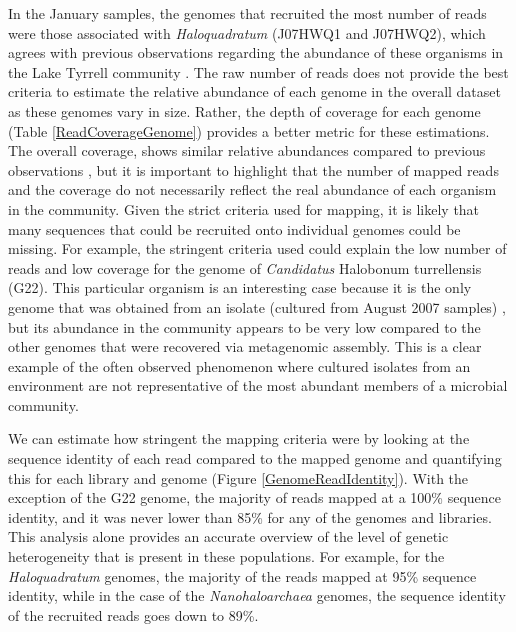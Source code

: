 In the January samples, the genomes that recruited the most number of reads were those associated with \textit{Haloquadratum} (J07HWQ1 and J07HWQ2), which agrees with previous observations regarding the abundance of these organisms in the Lake Tyrrell community \cite{Podell:2013kx}. The raw number of reads does not provide the best criteria to estimate the relative abundance of each genome in the overall dataset as these genomes vary in size. Rather, the depth of coverage for each genome (Table \ref{ReadCoverageGenome}) provides a better metric for these estimations. The overall coverage, shows similar relative abundances compared to previous observations \cite{Podell:2013kx}, but it is important to highlight that the number of mapped reads and the coverage do not necessarily reflect the real abundance of each organism in the community. Given the strict criteria used for mapping, it is likely that many sequences that could be recruited onto individual genomes could be missing. For example, the stringent criteria used could explain the low number of reads and low coverage for the genome of \textit{Candidatus} Halobonum turrellensis (G22). This particular organism is an interesting case because it is the only genome that was obtained from an isolate (cultured from August 2007 samples) \cite{Ugalde:2013hb}, but its abundance in the community appears to be very low compared to the other genomes that were recovered via metagenomic assembly. This is a clear example of the often observed phenomenon where cultured isolates from an environment are not representative of the most abundant members of a microbial community.

We can estimate how stringent the mapping criteria were by looking at the sequence identity of each read compared to the mapped genome and quantifying this for each library and genome (Figure \ref{GenomeReadIdentity}). With the exception of the G22 genome, the majority of reads mapped at a 100\% sequence identity, and it was never lower than 85\% for any of the genomes and libraries. This analysis alone provides an accurate overview of the level of genetic heterogeneity that is present in these populations. For example, for the \textit{Haloquadratum} genomes, the majority of the reads mapped at 95\% sequence identity, while in the case of the \textit{Nanohaloarchaea} genomes, the sequence identity of the recruited reads goes down to 89\%.

